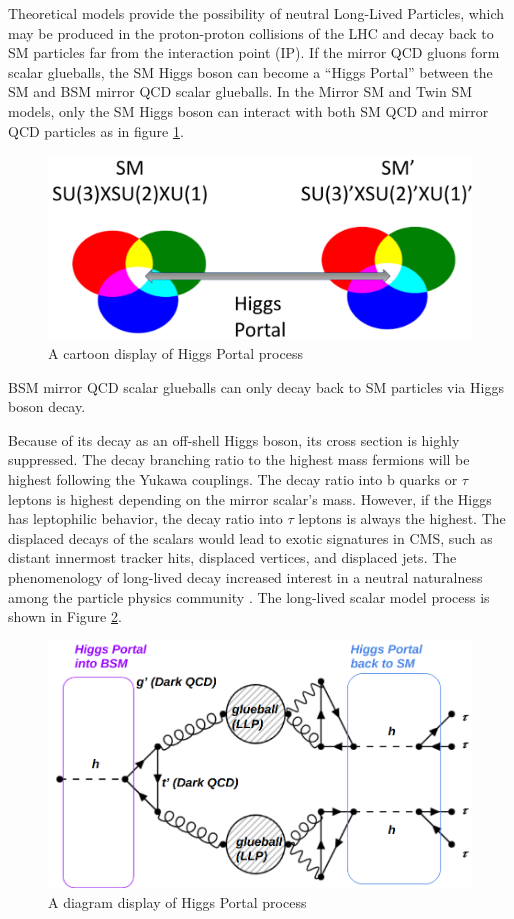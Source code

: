 Theoretical models provide the possibility of neutral Long-Lived Particles, which may be produced in the proton-proton
collisions of the LHC and decay back to SM particles far from the interaction point (IP).\cite{Craig:2015pha}
If the mirror QCD gluons form scalar glueballs, the SM Higgs boson can become a ``Higgs Portal'' between the SM and BSM mirror QCD scalar glueballs.
In the Mirror SM and Twin SM models, only the SM Higgs boson can interact with both SM QCD and mirror QCD particles as in figure \ref{fig:2HiggsPortal}.
\begin{figure}[h!]
  \label{fig:2HiggsPortal}
  \centering
  \includegraphics[width=0.87\linewidth]{figs/Portalcartoon.png}
  \caption{A cartoon display of Higgs Portal process}
\end{figure}
BSM mirror QCD scalar glueballs can only decay back to SM particles via Higgs boson decay.

Because of its decay as an off-shell Higgs boson, its cross section is highly suppressed.
The decay branching ratio to the highest mass fermions will be highest following the Yukawa couplings.
The decay ratio into b quarks or $\tau$ leptons is highest depending on the mirror scalar's mass.
However, if the Higgs has leptophilic behavior, the decay ratio into $\tau$ leptons is always the highest.
The displaced decays of the scalars would lead to exotic signatures in CMS, such as distant innermost tracker hits, displaced vertices, and displaced jets.
The phenomenology of long-lived decay increased interest in a neutral naturalness among the particle physics community \cite{Curtin:2015fna,Csaki:2015fba}.
The long-lived scalar model process is shown in Figure \ref{fig:HiggsPortal}.



\begin{figure}[h!]
  \label{fig:HiggsPortal}
  \centering
  \includegraphics[width=0.87\linewidth]{figs/TwinHiggs.png}
  \caption{A diagram display of Higgs Portal process}
\end{figure}
